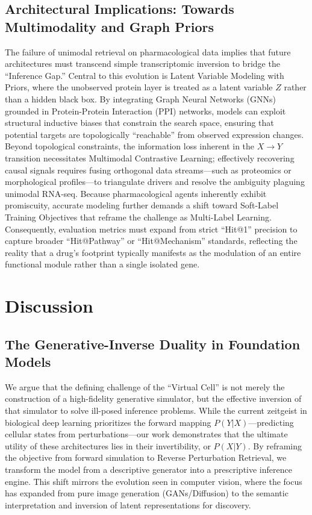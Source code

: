 \documentclass[conference]{IEEEtran}
\begin{document}
\subsection{Architectural Implications: Towards Multimodality and Graph Priors}
The failure of unimodal retrieval on pharmacological data implies that future architectures must transcend simple transcriptomic inversion to bridge the ``Inference Gap.'' Central to this evolution is Latent Variable Modeling with Priors, where the unobserved protein layer is treated as a latent variable $Z$ rather than a hidden black box. By integrating Graph Neural Networks (GNNs) grounded in Protein-Protein Interaction (PPI) networks, models can exploit structural inductive biases that constrain the search space, ensuring that potential targets are topologically ``reachable'' from observed expression changes. Beyond topological constraints, the information loss inherent in the $X \to Y$ transition necessitates Multimodal Contrastive Learning; effectively recovering causal signals requires fusing orthogonal data streams—such as proteomics or morphological profiles—to triangulate drivers and resolve the ambiguity plaguing unimodal RNA-seq. Because pharmacological agents inherently exhibit promiscuity, accurate modeling further demands a shift toward Soft-Label Training Objectives that reframe the challenge as Multi-Label Learning. Consequently, evaluation metrics must expand from strict ``Hit@1'' precision to capture broader ``Hit@Pathway'' or ``Hit@Mechanism'' standards, reflecting the reality that a drug's footprint typically manifests as the modulation of an entire functional module rather than a single isolated gene.

\section{Discussion}
\subsection{The Generative-Inverse Duality in Foundation Models}
We argue that the defining challenge of the ``Virtual Cell'' is not merely the construction of a high-fidelity generative simulator, but the effective inversion of that simulator to solve ill-posed inference problems. While the current zeitgeist in biological deep learning prioritizes the forward mapping $P(Y|X)$—predicting cellular states from perturbations—our work demonstrates that the ultimate utility of these architectures lies in their invertibility, or $P(X|Y)$. By reframing the objective from forward simulation to Reverse Perturbation Retrieval, we transform the model from a descriptive generator into a prescriptive inference engine. This shift mirrors the evolution seen in computer vision, where the focus has expanded from pure image generation (GANs/Diffusion) to the semantic interpretation and inversion of latent representations for discovery.
\end{document}
